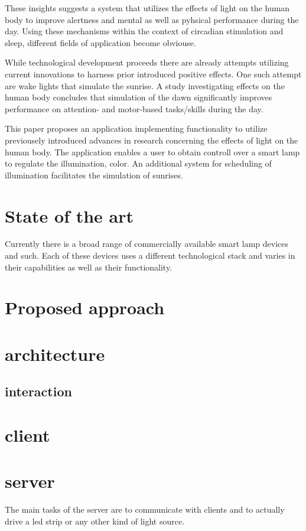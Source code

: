 \documentclass[conference]{IEEEtran}
\begin{document}
These insights suggests a system that utilizes the effects of light on the human body to improve alertness and mental as well as
pyhsical performance during the day. Using these mechanisms within the context of circadian stimulation and sleep, different
fields of application become obviouse.

While technological development proceeds there are already attempts utilizing current innovations to harness prior introduced 
positive effects. One such attempt are wake lights that simulate the sunrise. A study investigating effects on the human body
concludes that simulation of the dawn significantly improves performance on attention- and motor-based tasks/skills during the day.
\cite{Gabel2015a}

This paper proposes an application implementing functionality to utilize previousely introduced advances in research 
concerning the effects of light on the human body. The application enables a user to obtain controll over a smart lamp
to regulate the illumination, color. An additional system for scheduling of illumination facilitates the simulation of sunrises.

\section{State of the art}
Currently there is a broad range of commercially available smart lamp devices and such. Each of these
devices uses a different technological stack and varies in their capabilities as well as their functionality.


\section{Proposed approach}


\section{architecture}


\subsection{interaction}


\section{client}


\section{server}
The main tasks of the server are to communicate with clients and to actually drive a 
led strip or any other kind of light source.
\end{document}
